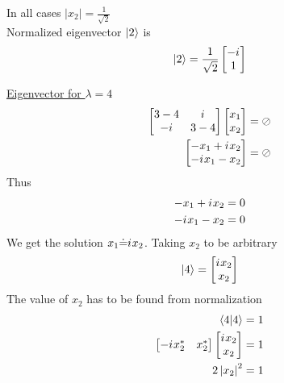 \begin{enumerate}
	In all cases $\left|x_2\right| = \frac{1}{\sqrt{2}}$\\
	
	Normalized eigenvector $\ket{2}$ is
	\begin{equation}
		\ket{2} = \frac{1}{\sqrt{2}} \left[\begin{matrix}
			-{i\mkern1mu} \\ 1
		\end{matrix}\right]
	\end{equation}
	
	
	\underline{Eigenvector for $\lambda=4$}\\
	\begin{eqnarray}
	\left[\begin{matrix}
	3-4 & {i\mkern1mu} \\ -{i\mkern1mu} & 3-4
	\end{matrix}\right]
	\left[\begin{matrix}
	x_1 \\ x_2
	\end{matrix}\right]
	&= \oslash \nonumber \\
	\left[\begin{matrix}
	-x_1 + {i\mkern1mu} x_2 \\ -{i\mkern1mu} x_1 - x_2
	\end{matrix}\right]
	&= \oslash \nonumber
	\end{eqnarray}
	Thus
	\begin{eqnarray}
	-x_1 + {i\mkern1mu} x_2 &= 0 \label{chapter5.eqn5-example2} \\
	-{i\mkern1mu} x_1 - x_2 &= 0 \label{chapter5.eqn6-example2}
	\end{eqnarray}
	We get the solution $x_1 \dot{=} {i\mkern1mu} x_2$. Taking $x_2$ to be arbitrary
	\begin{equation}
	\ket{4} = \left[\begin{matrix}
	{i\mkern1mu} x_2 \\ x_2
	\end{matrix}\right]
	\end{equation}
	The value of $x_2$ has to be found from normalization
	\begin{eqnarray}
	\braket{4}{4} &= 1 \nonumber \\
	\left[\begin{matrix}
	-\iu x_2^* & x_2^*
	\end{matrix}\right]
	\left[\begin{matrix}
	\iu x_2 \\ x_2
	\end{matrix}\right] 
	&=1 \nonumber \\
	2 \left|x_2\right|^2 &= 1 \nonumber \\

\end{eqnarray}
\end{enumerate}
